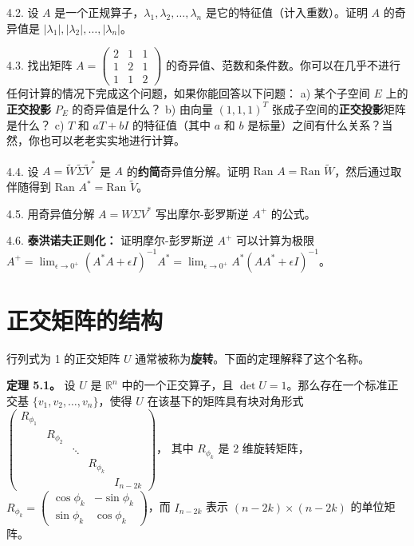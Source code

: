 4.2. 设 $A$ 是一个正规算子，$\lambda_1, \lambda_2, \dots, \lambda_n$ 是它的特征值（计入重数）。证明 $A$ 的奇异值是 $|\lambda_1|, |\lambda_2|, \dots, |\lambda_n|$。

4.3. 找出矩阵 $A = \begin{pmatrix} 2 & 1 & 1 \\ 1 & 2 & 1 \\ 1 & 1 & 2 \end{pmatrix}$ 的奇异值、范数和条件数。你可以在几乎不进行任何计算的情况下完成这个问题，如果你能回答以下问题：
a) 某个子空间 $E$ 上的\textbf{正交投影} $P_E$ 的奇异值是什么？
b) 由向量 $(1, 1, 1)^T$ 张成子空间的\textbf{正交投影}矩阵是什么？
c) $T$ 和 $aT + bI$ 的特征值（其中 $a$ 和 $b$ 是标量）之间有什么关系？当然，你也可以老老实实地进行计算。

4.4. 设 $A = \tilde{W} \tilde{\Sigma} \tilde{V}^*$ 是 $A$ 的\textbf{约简}奇异值分解。证明 $\text{Ran } A = \text{Ran } \tilde{W}$，然后通过取伴随得到 $\text{Ran } A^* = \text{Ran } \tilde{V}$。

4.5. 用奇异值分解 $A = W \Sigma V^*$ 写出摩尔-彭罗斯逆 $A^+$ 的公式。

4.6. \textbf{泰洪诺夫正则化：} 证明摩尔-彭罗斯逆 $A^+$ 可以计算为极限 $A^+ = \lim_{\epsilon \to 0^+} (A^*A + \epsilon I)^{-1} A^* = \lim_{\epsilon \to 0^+} A^*(AA^* + \epsilon I)^{-1}$。





\section{正交矩阵的结构}
行列式为 1 的正交矩阵 $U$ 通常被称为\textbf{旋转}。下面的定理解释了这个名称。

\textbf{定理 5.1。} 设 $U$ 是 $\mathbb{R}^n$ 中的一个正交算子，且 $\det U = 1$。那么存在一个标准正交基 $\{v_1, v_2, \dots, v_n\}$，使得 $U$ 在该基下的矩阵具有块对角形式
$\begin{pmatrix} R_{\phi_1} & & & & \\ & R_{\phi_2} & & & \\ & & \ddots & & \\ & & & R_{\phi_k} & \\ & & & & I_{n-2k} \end{pmatrix}$，
其中 $R_{\phi_k}$ 是 $2$ 维旋转矩阵，$R_{\phi_k} = \begin{pmatrix} \cos \phi_k & -\sin \phi_k \\ \sin \phi_k & \cos \phi_k \end{pmatrix}$，而 $I_{n-2k}$ 表示 $(n-2k) \times (n-2k)$ 的单位矩阵。

